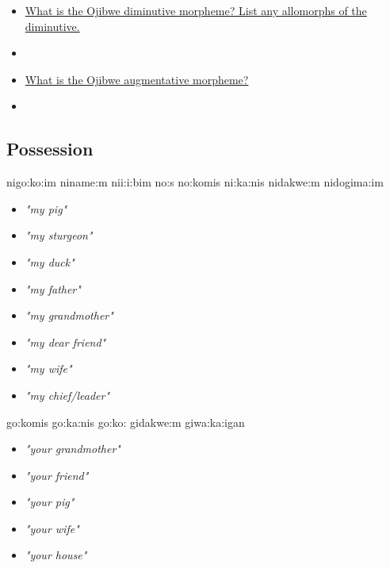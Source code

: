 \documentclass[a4paper,11pt]{article}
\begin{document}
\vspace{1cm}

\begin{itemize}
\item \underline{What is the Ojibwe diminutive morpheme? List any allomorphs of the diminutive.}
\item[] 
\item \underline{What is the Ojibwe augmentative morpheme?}
\item[] 
\end{itemize}



\pagebreak
\subsection{Possession}



\begin{multicols}{2}
\begin{exe}
\ex nigo:ko:im 
\ex niname:m 
\ex ni{\textyogh}i:i:bim 
\ex no:s 
\ex no:komis 
\ex ni:ka:nis 
\ex nidakwe:m 
\ex nidogima:im 
\end{exe}
\columnbreak
\begin{itemize}
\item[] \textit{"my pig"}
\item[] \textit{"my sturgeon"}
\item[] \textit{"my duck"}
\item[] \textit{"my father"}
\item[] \textit{"my grandmother"}
\item[] \textit{"my dear friend"}
\item[] \textit{"my wife"}
\item[] \textit{"my chief/leader"}
\end{itemize}
\end{multicols}


\begin{multicols}{2}
\begin{exe}
\ex go:komis 
\ex go:ka:nis
\ex go:ko: 
\ex gidakwe:m 
\ex giwa:ka:{\textglotstop}igan 
\end{exe}
\columnbreak
\begin{itemize}
\item[] \textit{"your grandmother"}
\item[] \textit{"your friend"}
\item[] \textit{"your pig"}
\item[] \textit{"your wife"}
\item[] \textit{"your house"}
\end{itemize}
\end{multicols}
\end{document}
